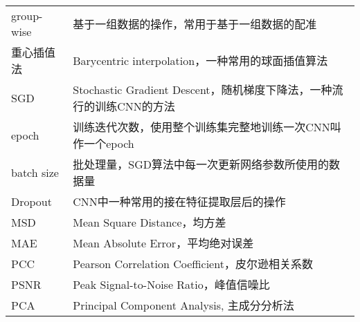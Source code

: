 \begin{center}
\begin{longtable}{>{\raggedleft}p{}  p{}}
            group-wise & 基于一组数据的操作，常用于基于一组数据的配准 \\
            重心插值法 & Barycentric interpolation，一种常用的球面插值算法 \\
            SGD  & Stochastic Gradient Descent，随机梯度下降法，一种流行的训练CNN的方法 \\
            epoch & 训练迭代次数，使用整个训练集完整地训练一次CNN叫作一个epoch \\
            batch size & 批处理量，SGD算法中每一次更新网络参数所使用的数据量   \\
            Dropout & CNN中一种常用的接在特征提取层后的操作 \\
            MSD  & Mean Square Distance，均方差 \\
            MAE & Mean Absolute Error，平均绝对误差 \\
            PCC  & Pearson Correlation Coefficient，皮尔逊相关系数 \\
            PSNR & Peak Signal-to-Noise Ratio，峰值信噪比 \\
            PCA & Principal Component Analysis, 主成分分析法 \\
    \end{longtable}
\end{center}
